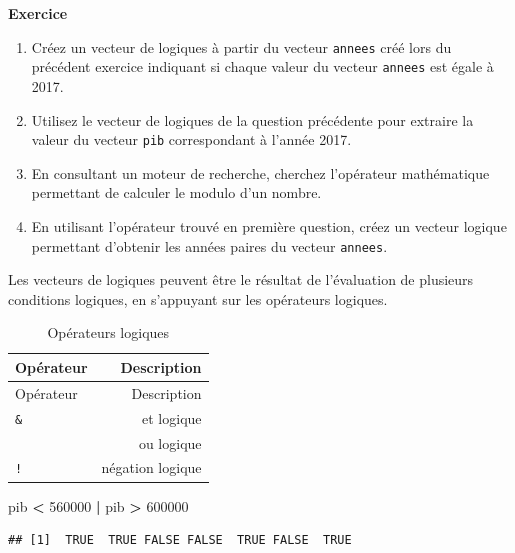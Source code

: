 \documentclass[
  11pt,
]{book}
\newenvironment{Shaded}{\begin{snugshade}}{\end{snugshade}}
\newcommand{\DecValTok}[1]{\textcolor[rgb]{0.00,0.00,0.81}{#1}}
\newcommand{\NormalTok}[1]{#1}
\newcommand{\SpecialCharTok}[1]{\textcolor[rgb]{0.81,0.36,0.00}{\textbf{#1}}}
\providecommand{\tightlist}{%
  \setlength{\itemsep}{0pt}\setlength{\parskip}{0pt}}
\numberwithin{equation}{section}
\numberwithin{countremarque}{section}
\newenvironment{greenbox}{
  \begin{tcolorbox}[breakable, colback=vert,coltext=black,
                  colframe=grisfonce]}
 {\end{tcolorbox}}
\begin{document}
\begin{greenbox}

\textbf{Exercice}

\begin{enumerate}
\def\labelenumi{\arabic{enumi}.}
\tightlist
\item
  Créez un vecteur de logiques à partir du vecteur \texttt{annees} créé lors du précédent exercice indiquant si chaque valeur du vecteur \texttt{annees} est égale à 2017.
\item
  Utilisez le vecteur de logiques de la question précédente pour extraire la valeur du vecteur \texttt{pib} correspondant à l'année 2017.
\item
  En consultant un moteur de recherche, cherchez l'opérateur mathématique permettant de calculer le modulo d'un nombre.
\item
  En utilisant l'opérateur trouvé en première question, créez un vecteur logique permettant d'obtenir les années paires du vecteur \texttt{annees}.
\end{enumerate}

\end{greenbox}

Les vecteurs de logiques peuvent être le résultat de l'évaluation de plusieurs conditions logiques, en s'appuyant sur les opérateurs logiques.

\begin{longtable}[]{@{}lr@{}}
\caption{\label{tab:operateurs-logiques} Opérateurs logiques}\tabularnewline
\toprule\noalign{}
Opérateur & Description \\
\midrule\noalign{}
\endfirsthead
\toprule\noalign{}
Opérateur & Description \\
\midrule\noalign{}
\endhead
\bottomrule\noalign{}
\endlastfoot
\texttt{\&} & et logique \\
\texttt{\textbar{}} & ou logique \\
\texttt{!} & négation logique \\
\end{longtable}

\begin{Shaded}
\begin{Highlighting}[]
\NormalTok{pib }\SpecialCharTok{\textless{}} \DecValTok{560000} \SpecialCharTok{|}\NormalTok{ pib }\SpecialCharTok{\textgreater{}} \DecValTok{600000}
\end{Highlighting}
\end{Shaded}

\begin{lstlisting}
## [1]  TRUE  TRUE FALSE FALSE  TRUE FALSE  TRUE
\end{lstlisting}
\end{document}
